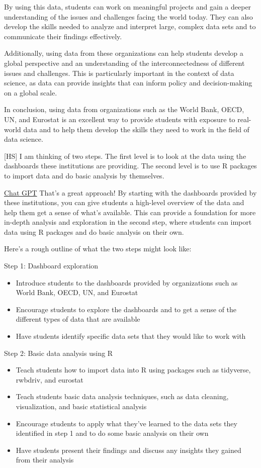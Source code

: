 \documentclass[
]{book}
\providecommand{\tightlist}{%
  \setlength{\itemsep}{0pt}\setlength{\parskip}{0pt}}
\theoremstyle{definition}
\theoremstyle{definition}
\theoremstyle{definition}
\theoremstyle{definition}
\theoremstyle{remark}
\begin{document}
By using this data, students can work on meaningful projects and gain a deeper understanding of the issues and challenges facing the world today. They can also develop the skills needed to analyze and interpret large, complex data sets and to communicate their findings effectively.

Additionally, using data from these organizations can help students develop a global perspective and an understanding of the interconnectedness of different issues and challenges. This is particularly important in the context of data science, as data can provide insights that can inform policy and decision-making on a global scale.

In conclusion, using data from organizations such as the World Bank, OECD, UN, and Eurostat is an excellent way to provide students with exposure to real-world data and to help them develop the skills they need to work in the field of data science.

{[}HS{]} I am thinking of two steps. The first level is to look at the data using the dashboards these institutions are providing. The second level is to use R packages to import data and do basic analysis by themselves.

\protect\hyperlink{chatgpt}{Chat GPT} That's a great approach! By starting with the dashboards provided by these institutions, you can give students a high-level overview of the data and help them get a sense of what's available. This can provide a foundation for more in-depth analysis and exploration in the second step, where students can import data using R packages and do basic analysis on their own.

Here's a rough outline of what the two steps might look like:

Step 1: Dashboard exploration

\begin{itemize}
\tightlist
\item
  Introduce students to the dashboards provided by organizations such as World Bank, OECD, UN, and Eurostat
\item
  Encourage students to explore the dashboards and to get a sense of the different types of data that are available
\item
  Have students identify specific data sets that they would like to work with
\end{itemize}

Step 2: Basic data analysis using R

\begin{itemize}
\tightlist
\item
  Teach students how to import data into R using packages such as tidyverse, rwbdriv, and eurostat
\item
  Teach students basic data analysis techniques, such as data cleaning, visualization, and basic statistical analysis
\item
  Encourage students to apply what they've learned to the data sets they identified in step 1 and to do some basic analysis on their own
\item
  Have students present their findings and discuss any insights they gained from their analysis
\end{itemize}
\end{document}
